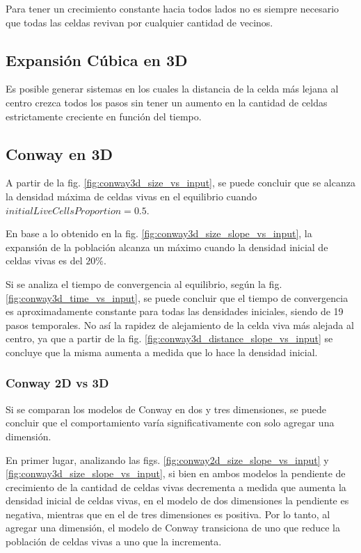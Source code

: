 Para tener un crecimiento constante hacia todos lados no es siempre necesario que todas las celdas revivan por cualquier cantidad de vecinos.

\subsection{Expansión Cúbica en 3D}\label{subsec:cubito-3D-conc}

Es posible generar sistemas en los cuales la distancia de la celda más lejana al centro crezca todos los pasos sin tener un aumento en la
cantidad de celdas estrictamente creciente en función del tiempo.

\subsection{Conway en 3D}\label{subsec:conway-en-3D-conc}

A partir de la fig. \ref{fig:conway3d_size_vs_input}, se puede concluir que se alcanza la densidad máxima de
celdas vivas en el equilibrio cuando $initialLiveCellsProportion = 0.5$.

En base a lo obtenido en la fig. \ref{fig:conway3d_size_slope_vs_input}, la expansión de la población
alcanza un máximo cuando la densidad inicial de celdas vivas es del $20\%$.

Si se analiza el tiempo de convergencia al equilibrio, según la fig. \ref{fig:conway3d_time_vs_input},
se puede concluir que el tiempo de convergencia es aproximadamente constante para todas las densidades iniciales,
siendo de 19 pasos temporales.
No así la rapidez de alejamiento de la celda viva más alejada al centro, ya que a partir de
la fig. \ref{fig:conway3d_distance_slope_vs_input} se concluye que la misma aumenta a medida que lo
hace la densidad inicial.

\subsubsection{Conway 2D vs 3D}\label{subsubsec:conway-2D-vs-3D-conc}
Si se comparan los modelos de Conway en dos y tres dimensiones, se puede concluir que el comportamiento
varía significativamente con solo agregar una dimensión.

En primer lugar, analizando las figs. \ref{fig:conway2d_size_slope_vs_input} y \ref{fig:conway3d_size_slope_vs_input},
si bien en ambos modelos la pendiente de crecimiento de la cantidad de celdas vivas
decrementa a medida que aumenta la densidad inicial de celdas vivas,
en el modelo de dos dimensiones la pendiente es negativa, mientras que en el de tres dimensiones es positiva.
Por lo tanto, al agregar una dimensión, el modelo de Conway transiciona de uno que reduce la población de celdas vivas
a uno que la incrementa.

